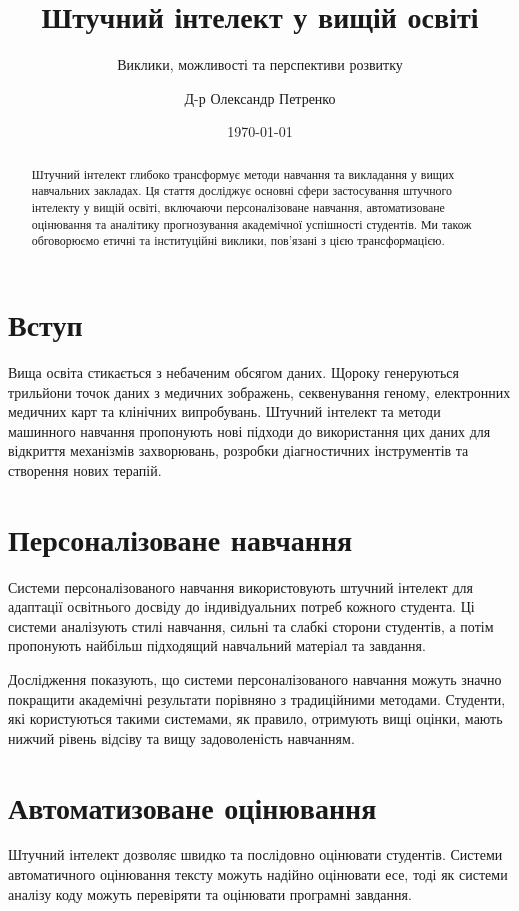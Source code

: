 \documentclass[
    language=ukrainian,
    doctype=article,
]{../../omnilatex}
\title{Штучний інтелект у вищій освіті}
\subtitle{Виклики, можливості та перспективи розвитку}
\author{Д-р Олександр Петренко}
\date{\today}
\begin{document}
\maketitle

\begin{abstract}
Штучний інтелект глибоко трансформує методи навчання та викладання у вищих навчальних закладах. Ця стаття досліджує основні сфери застосування штучного інтелекту у вищій освіті, включаючи персоналізоване навчання, автоматизоване оцінювання та аналітику прогнозування академічної успішності студентів. Ми також обговорюємо етичні та інституційні виклики, пов'язані з цією трансформацією.
\end{abstract}

\section{Вступ}
Вища освіта стикається з небаченим обсягом даних. Щороку генеруються трильйони точок даних з медичних зображень, секвенування геному, електронних медичних карт та клінічних випробувань. Штучний інтелект та методи машинного навчання пропонують нові підходи до використання цих даних для відкриття механізмів захворювань, розробки діагностичних інструментів та створення нових терапій.

\section{Персоналізоване навчання}
Системи персоналізованого навчання використовують штучний інтелект для адаптації освітнього досвіду до індивідуальних потреб кожного студента. Ці системи аналізують стилі навчання, сильні та слабкі сторони студентів, а потім пропонують найбільш підходящий навчальний матеріал та завдання.

Дослідження показують, що системи персоналізованого навчання можуть значно покращити академічні результати порівняно з традиційними методами. Студенти, які користуються такими системами, як правило, отримують вищі оцінки, мають нижчий рівень відсіву та вищу задоволеність навчанням.

\section{Автоматизоване оцінювання}
Штучний інтелект дозволяє швидко та послідовно оцінювати студентів. Системи автоматичного оцінювання тексту можуть надійно оцінювати есе, тоді як системи аналізу коду можуть перевіряти та оцінювати програмні завдання.
\end{document}
